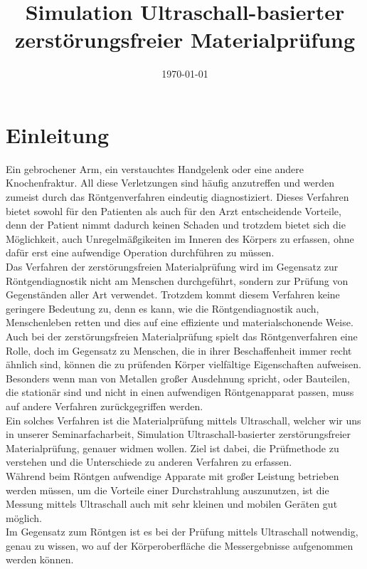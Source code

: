 \documentclass[reducespace,stylepage,semiarbeit]{spezidoc}
\title{Simulation Ultraschall-basierter zerstörungsfreier Materialprüfung}
\date{\today}
\begin{document}
\maketitlepage
\newpage


\tableofcontents
\thispagestyle{empty}
\newpage

\setcounter{page}{1}

\section{Einleitung}
Ein gebrochener Arm, ein verstauchtes Handgelenk oder eine andere Knochenfraktur. 
All diese Verletzungen sind häufig anzutreffen und werden zumeist durch das Röntgenverfahren eindeutig diagnostiziert. %
Dieses Verfahren bietet sowohl für den Patienten als auch für den Arzt entscheidende Vorteile, denn der Patient nimmt dadurch keinen Schaden und trotzdem bietet sich die Möglichkeit, auch Unregelmäßgikeiten im Inneren des Körpers zu erfassen, ohne dafür erst eine aufwendige Operation durchführen zu müssen.\\
Das Verfahren der zerstörungsfreien Materialprüfung wird im Gegensatz zur Röntgendiagnostik nicht am Menschen durchgeführt, sondern zur Prüfung von Gegenständen aller Art verwendet. 
Trotzdem kommt diesem Verfahren keine geringere Bedeutung zu, denn es kann, wie die Röntgendiagnostik auch, Menschenleben retten und dies auf eine effiziente und materialschonende Weise.\\ 
Auch bei der zerstörungsfreien Materialprüfung spielt das Röntgenverfahren eine Rolle, doch im Gegensatz zu Menschen, die in ihrer Beschaffenheit immer recht ähnlich sind, können die zu prüfenden Körper vielfältige Eigenschaften aufweisen. 
Besonders wenn man von Metallen großer Ausdehnung spricht, oder Bauteilen, die stationär sind und nicht in einen aufwendigen Röntgenapparat passen, muss auf andere Verfahren zurückgegriffen werden.\\
Ein solches Verfahren ist die Materialprüfung mittels Ultraschall, welcher wir uns in unserer Seminarfacharbeit, \glqq Simulation Ultraschall-basierter zerstörungsfreier Materialprüfung\grqq , genauer widmen wollen. 
Ziel ist dabei, die Prüfmethode zu verstehen und die Unterschiede zu anderen Verfahren zu erfassen.\\
Während beim Röntgen aufwendige Apparate mit großer Leistung betrieben werden müssen, um die Vorteile einer Durchstrahlung auszunutzen, ist die Messung mittels Ultraschall auch mit sehr kleinen und mobilen Geräten gut möglich. \\ 
Im Gegensatz zum Röntgen ist es bei der Prüfung mittels Ultraschall notwendig, genau zu wissen, wo auf der Körperoberfläche die Messergebnisse aufgenommen werden können. 
\end{document}
